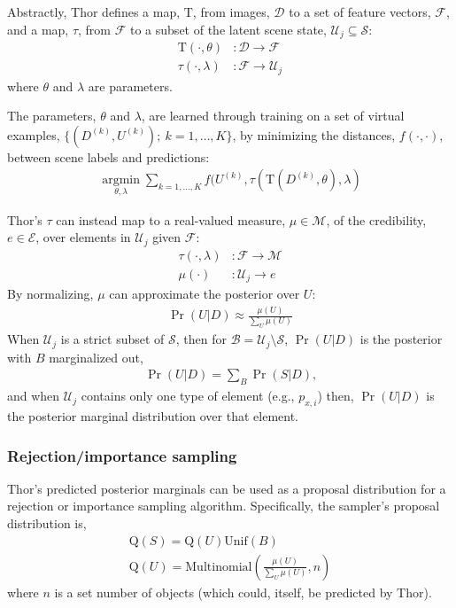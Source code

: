 \documentclass[]{report}
\begin{document}
Abstractly, Thor defines a map, $\mathrm{T}$, from images,
$\mathcal{D}$ to a set of feature vectors, $\mathcal{F}$, and a map,
$\tau$, from $\mathcal{F}$ to a subset of the latent scene state,
$\mathcal{U}_j \subseteq \mathcal{S}$:
\begin{align*}
  \mathrm{T}(\cdot, \theta) &: \mathcal{D} \rightarrow \mathcal{F}\\
  \tau(\cdot, \lambda) &: \mathcal{F} \rightarrow \mathcal{U}_j
\end{align*}
where $\theta$ and $\lambda$ are parameters.

The parameters, $\theta$ and $\lambda$, are learned through training
on a set of virtual examples, $\{(D^{(k)}, U^{(k)});\ k=1, \dots,
K\}$, by minimizing the distances, $f(\cdot,\cdot)$, between scene
labels and predictions:
\begin{align*}
  \underset{\theta, \lambda}{\operatorname{argmin}} \sum_{k=1, \dots, K}
  f(U^{(k)}, \tau(\mathrm{T}(D^{(k)}, \theta), \lambda)
\end{align*}

Thor's $\tau$ can instead map to a real-valued measure, $\mu \in
\mathcal{M}$, of the credibility, $e \in \mathcal{E}$, over elements
in $\mathcal{U}_j$ given $\mathcal{F}$:
\begin{align*}
  \tau(\cdot, \lambda) &: \mathcal{F} \rightarrow \mathcal{M}\\
  \mu(\cdot) &: \mathcal{U}_j \rightarrow e
\end{align*}
By normalizing, $\mu$ can approximate the posterior over $U$:
\begin{align*}
  \Pr(U|D) \approx \frac{\mu(U)}{\sum_U \mu(U)}
\end{align*}
When $\mathcal{U}_j$ is a strict subset of $\mathcal{S}$, then for
$\mathcal{B} = \mathcal{U}_j \setminus \mathcal{S}$, $\Pr(U|D)$ is the
posterior with $B$ marginalized out,
\begin{align*}
  \Pr(U|D) = \sum_B \Pr(S|D) \text{,}
\end{align*}
and when $\mathcal{U}_j$ contains only one type of element (e.g.,
$p_{x,i}$) then, $\Pr(U|D)$ is the posterior marginal distribution
over that element.


\subsubsection*{Rejection/importance sampling}
Thor's predicted posterior marginals can be used as a proposal
distribution for a rejection or importance sampling
algorithm. Specifically, the sampler's proposal distribution is,
\begin{align*}
\mathrm{Q}(S) = \mathrm{Q}(U) \mathrm{Unif}(B)\\
\mathrm{Q}(U) = \mathrm{Multinomial}(\frac{\mu(U)}{\sum_U \mu(U)}, n)
\end{align*}
where $n$ is a set number of objects (which could, itself, be predicted by Thor).
\end{document}
